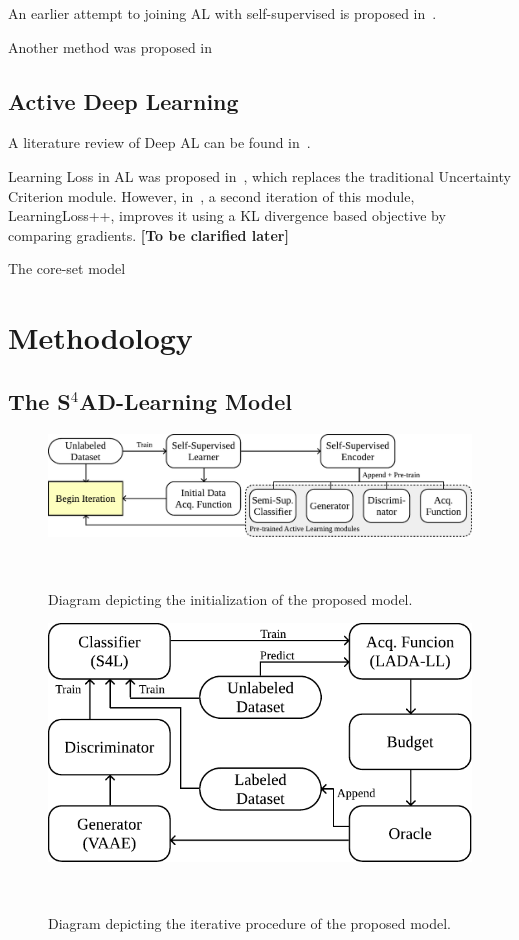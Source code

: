 \documentclass{article}
\begin{document}
An earlier attempt to joining AL with self-supervised is proposed
in~\cite{yuan2020cold}.

Another method was proposed in~\cite{bengar2021reducing} 

\subsection{Active Deep Learning}

A literature review of Deep AL can be found in~\cite{ren2021survey}.

Learning Loss in AL was proposed in~\cite{yoo2019learning}, which replaces the
traditional Uncertainty Criterion module. However,
in~\cite{shukla2021mathematical}, a second iteration of this module,
LearningLoss++, improves it using a KL divergence based objective by
comparing gradients. {\bf [To be clarified later]}

The core-set model~\cite{sener2017active}

\section{Methodology}

\subsection{The S\texorpdfstring{$^4$}{TEXT}AD-Learning Model}

\begin{figure}[htb]
	\centering
    \includegraphics[width=\linewidth]{../analysis/al_initialization}
    \caption{%
        Diagram depicting the initialization of the proposed model. 
    }~\label{fig:al_initialization}
\end{figure}

\begin{figure}[htb]
	\centering
    \includegraphics[width=.6\linewidth]{../analysis/al_iteration}
    \caption{%
        Diagram depicting the iterative procedure of the proposed model. 
    }~\label{fig:al_iteration}
\end{figure}
\end{document}
